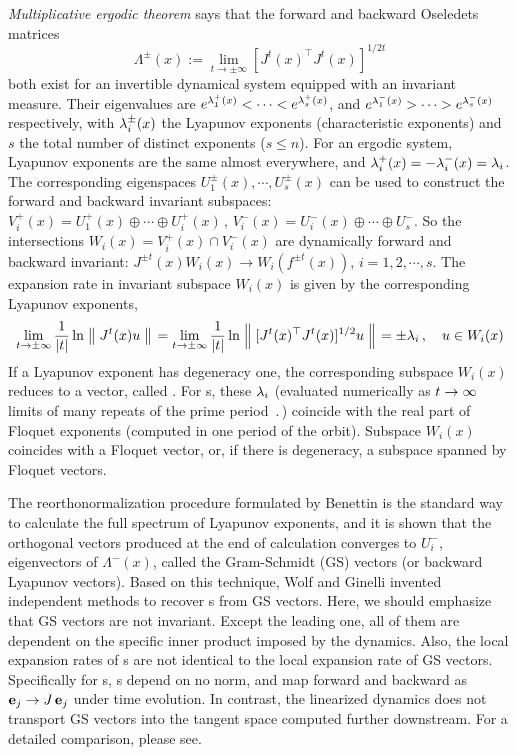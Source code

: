 \documentclass[final,leqno,onefignum,onetabnum]{siamltexmm}
\begin{document}
\emph{Multiplicative ergodic theorem} says that the forward and backward
Oseledets matrices
\begin{equation}
\Lambda^{\pm}(x) :=\lim_{t\to\pm\infty}[J^t(x)^\top J^{t}(x)]^{1/2t}
\label{eq:oseledets}
\end{equation}
both exist for an invertible dynamical system equipped with an invariant measure.
Their eigenvalues are
$e^{\Lyap^{+}_1(x)}<\cdots<e^{\Lyap^{+}_s(x)}$,
{and $e^{\Lyap^{-}_1(x)}>\cdots>e^{\Lyap^{-}_s(x)}$ respectively,}
with $\Lyap^{\pm}_i(x)$ the
Lyapunov exponents (characteristic exponents) and $s$
the total number of distinct exponents ($s\le n$). For an ergodic system,
Lyapunov exponents are the same almost everywhere, and
$\Lyap^{+}_i(x)=-\Lyap^{-}_{i}(x)=\Lyap_i$.
The corresponding eigenspaces
$U^\pm_1(x), \cdots, U^\pm_s(x)$
can be used to construct the forward and backward invariant subspaces:
{
$
V^+_i(x)=U^+_1(x) \oplus \cdots \oplus U^+_i(x)\,,\,
V^-_i(x)=U^-_i(x) \oplus \cdots \oplus U^-_{s}
$.} So the intersections $W_i(x)=V^+_i(x)\cap V^-_i(x)$ are dynamically
forward and backward invariant: $J^{\pm t}(x)W_i(x) \to W_i(f^{\pm t}(x))$,
$i = 1, 2,\cdots,s$.
The expansion rate in invariant subspace $W_i(x)$ is given
by the corresponding Lyapunov exponents,
\begin{equation}
  \label{eq:lyapunov}
  \lim_{t\to\pm\infty}\frac{1}{|t|}\ln\norm{J^t(x)u}
  =\lim_{t\to\pm\infty}\frac{1}{|t|}\ln\norm{[J^t(x)^\top J^t(x)]^{1/2}u}
  = \pm\Lyap_i
  \,,\quad  u\in W_i(x)
\end{equation}
If a Lyapunov exponent has degeneracy one, the corresponding
subspace $W_i(x)$ reduces to a vector, called {\emph{\cLv}}.
For \po s, these $\Lyap_i$
(evaluated numerically as $\zeit\to\infty$ limits of many repeats of the
prime period $\period{}$) coincide with the real part of Floquet exponents
(computed in one period of the orbit). Subspace $W_i(x)$ coincides with
a Floquet vector, or, if there is degeneracy, a subspace
spanned by Floquet vectors.

The reorthonormalization procedure
formulated by Benettin {\etal}
is
the standard way to calculate the full spectrum of Lyapunov exponents,
and it is shown
that the orthogonal vectors produced at the end of
calculation converges to $U_i^{-}$, eigenvectors of $\Lambda^{-}(x)$, called
the {Gram-Schmidt (GS) vectors (or backward Lyapunov vectors).}
Based on this technique,
Wolf {\etal} and
Ginelli {\etal}
invented independent methods to recover \cLv s
from GS vectors. Here, we should emphasize that GS vectors are
not invariant. Except the leading one, all of them are dependent on
the specific inner product imposed by the dynamics. Also, the local expansion
rates of \cLv s are not
identical to the local expansion rate of GS vectors. Specifically for
\po s, \Fv s depend on no norm, and map forward and
backward as $\jEigvec[j] \to \jMps\,\jEigvec[j]$ under time evolution.
In contrast, the linearized dynamics does not transport GS vectors into
the tangent space computed further downstream. For a detailed
comparison, please see.
\end{document}
